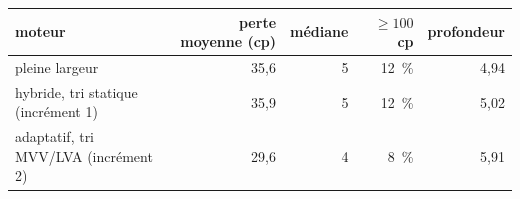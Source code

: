 \begin{tabular}{lrrrr}\toprule moteur & perte moyenne (cp) & médiane & $\ge 100$~cp & profondeur\\\midrule
pleine largeur & 35{,}6 & 5 & 12~\% & 4{,}94\\
hybride, tri statique (incrément 1) & 35{,}9 & 5 & 12~\% & 5{,}02\\
adaptatif, tri MVV/LVA (incrément 2) & 29{,}6 & 4 & 8~\% & 5{,}91\\\bottomrule\end{tabular}
